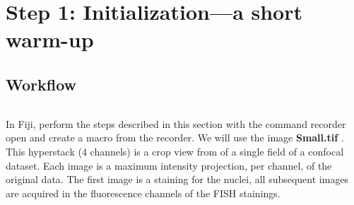 \section{Step 1: Initialization---a short warm-up}

\subsection{Workflow}
\begin{verbatim}

\end{verbatim}
In Fiji, perform the steps described in this section with the command recorder open and create a macro from the recorder.
We will use the image \textbf{Small.tif} .\\

This hyperstack (4 channels) is a crop view from of a single field of a confocal dataset.
Each image is a maximum intensity projection, per channel, of the original data. 
The first image is a staining for the nuclei, all subsequent images are acquired in the fluorescence channels of the FISH stainings.

